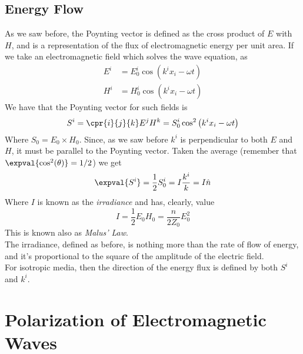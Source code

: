 \documentclass[../electromagnetism.tex]{subfiles}
\begin{document}
\subsection{Energy Flow}
As we saw before, the Poynting vector is defined as the cross product of $E$ with $H$, and is a representation of the flux of electromagnetic energy per unit area. If we take an electromagnetic field which solves the wave equation, as 
\begin{equation}
	\begin{aligned}
		E^i&= E_0^i\cos\left( k^ix_i-\omega t \right)\\
		H^i&= H_0^i\cos\left( k^ix_i-\omega t \right)
	\end{aligned}
	\label{eq:planewaveem}
\end{equation}
We have that the Poynting vector for such fields is
\begin{equation*}
	S^i=\cpr{i}{j}{k}E^jH^k=S^i_0\cos^2\left( k^ix_i-\omega t \right)
\end{equation*}
Where $S_0=E_0\times H_0$. Since, as we saw before $k^i$ is perpendicular to both $E$ and $H$, it must be parallel to the Poynting vector. Taken the average (remember that $\expval{\cos^2(\theta)}=1/2$) we get
\begin{equation}
	\expval{S^i}=\frac{1}{2}S^i_0=I\frac{k^i}{k}=I\hat{n}
	\label{eq:poyntingvec}
\end{equation}
Where $I$ is known as the \textit{irradiance} and has, clearly, value
\begin{equation*}
	I=\frac{1}{2}E_0H_0=\frac{n}{2Z_0}E_0^2
\end{equation*}
This is known also as \textit{Malus' Law}.\\
The irradiance, defined as before, is nothing more than the rate of flow of energy, and it's proportional to the square of the amplitude of the electric field.\\
For isotropic media, then the direction of the energy flux is defined by both $S^i$ and $k^i$.
\section{Polarization of Electromagnetic Waves}
\end{document}
